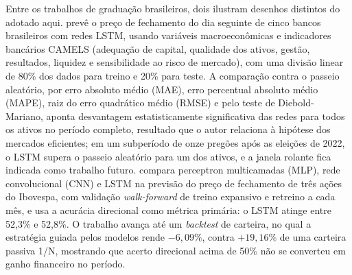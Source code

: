 Entre os trabalhos de graduação brasileiros, dois ilustram desenhos distintos do adotado aqui.  prevê o preço de fechamento do dia seguinte de cinco bancos brasileiros com redes LSTM, usando variáveis macroeconômicas e indicadores bancários CAMELS (adequação de capital, qualidade dos ativos, gestão, resultados, liquidez e sensibilidade ao risco de mercado), com uma divisão linear de 80\% dos dados para treino e 20\% para teste. A comparação contra o passeio aleatório, por erro absoluto médio (MAE), erro percentual absoluto médio (MAPE), raiz do erro quadrático médio (RMSE) e pelo teste de Diebold-Mariano, aponta desvantagem estatisticamente significativa das redes para todos os ativos no período completo, resultado que o autor relaciona à hipótese dos mercados eficientes; em um subperíodo de onze pregões após as eleições de 2022, o LSTM supera o passeio aleatório para um dos ativos, e a janela rolante fica indicada como trabalho futuro.  compara perceptron multicamadas (MLP), rede convolucional (CNN) e LSTM na previsão do preço de fechamento de três ações do Ibovespa, com validação \textit{walk-forward} de treino expansivo e retreino a cada mês, e usa a acurácia direcional como métrica primária: o LSTM atinge entre 52,3\% e 52,8\%. O trabalho avança até um \textit{backtest} de carteira, no qual a estratégia guiada pelos modelos rende \(-6{,}09\%\), contra \(+19{,}16\%\) de uma carteira passiva 1/N, mostrando que acerto direcional acima de 50\% não se converteu em ganho financeiro no período.

